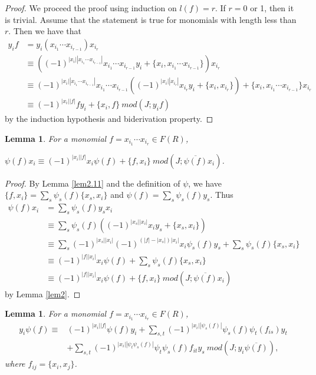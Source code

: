 \documentclass[a4paper,10pt]{amsart}
\newtheorem{lemma}[theorem]{Lemma}
\theoremstyle{definition}
\theoremstyle{remark}
\numberwithin{equation}{section}
\begin{document}
\begin{proof}
We proceed the proof using induction on $l(f)=r$. If $r=$0 or 1, then
it is trivial. Assume that the statement is true for monomials with
length less than $r$. Then we have that
\begin{equation}
\begin{split}
y_if&=y_i(x_{i_1}\cdots x_{i_{r-1}})x_{i_r}\\
&\equiv((-1)^{|x_i||x_{i_1}\cdots x_{i_{r-1}}|}x_{i_1}\cdots x_{i_{r-1}}y_i+\{x_i, x_{i_1}\cdots x_{i_{r-1}}\})x_{i_r}\\
&\equiv(-1)^{|x_i||x_{i_1}\cdots x_{i_{r-1}}|}x_{i_1}\cdots x_{i_{r-1}}((-1)^{|x_i||x_{i_r}|}x_{i_r}y_i+\{x_i,
x_{i_r}\})+\{x_i, x_{i_1}\cdots x_{i_{r-1}}\}x_{i_r}\\
&\equiv(-1)^{|x_i||f|}fy_i+\{x_i, f\} ~mod (J; y_if)
\end{split}\nonumber
\end{equation}
by the induction hypothesis and biderivation property.
\end{proof}

\begin{lemma}\label{lem3}
For a monomial $f=x_{i_1}\cdots x_{i_r}\in F(R)$,
\begin{center}
$\psi(f)x_i\equiv (-1)^{|x_i||f|}x_i\psi(f)+\{f, x_i\}~mod (J;
\overline{\psi(f)}x_i)$.
 \end{center}
\end{lemma}

\begin{proof}
By Lemma \ref{lem2.11} and the definition of $\psi$, we have $\{f, x_i\}=\sum_{s}\psi_s(f)\{x_s, x_i\}$ and $\psi(f)=\sum_{s}\psi_s(f)y_s$. Thus
\begin{equation}
\begin{split}
\psi(f)x_i&=\sum_{s}\psi_{s}(f)y_{s}x_i\\&
\equiv\sum_{s}\psi_{s}(f)((-1)^{|x_{s}||x_i|}x_iy_{s}+\{x_{s},
x_i\})\\
&\equiv\sum_{s}(-1)^{|x_{s}||x_i|}(-1)^{(|f|-|x_{s}|)|x_i|}x_i\psi_{s}(f)y_{s}+\sum_{s}\psi_{s}(f)\{x_{s},
x_i\}\\
&\equiv(-1)^{|f||x_i|}x_i\psi(f)+\sum_{s}\psi_{s}(f)\{x_{s},
x_i\}\\
&\equiv(-1)^{|f||x_i|}x_i\psi(f)+\{f, x_i\} ~mod (J;
\overline{\psi(f)}x_i)
\end{split}\nonumber
\end{equation}
by Lemma \ref{lem2}.
\end{proof}

\begin{lemma}\label{lem4}
For a monomial $f=x_{i_1}\cdots x_{i_r}\in F(R)$,
\begin{align*}
y_i\psi(f)\equiv& (-1)^{|x_i||f|}\psi(f)y_i+\sum_{s,
t}(-1)^{|x_i||\psi_{s}(f)|}\psi_{s}(f)\psi_{t}(f_{is})y_{t}\\
&+\sum_{s,
t}(-1)^{|x_i||\psi_{t}\psi_{s}(f)|}\psi_{t}\psi_{s}(f)f_{it}y_{s} ~mod (J; y_i\overline{\psi(f)}),
\end{align*}
where $f_{ij}=\{x_i, x_j\}$.
\end{lemma}
\end{document}
